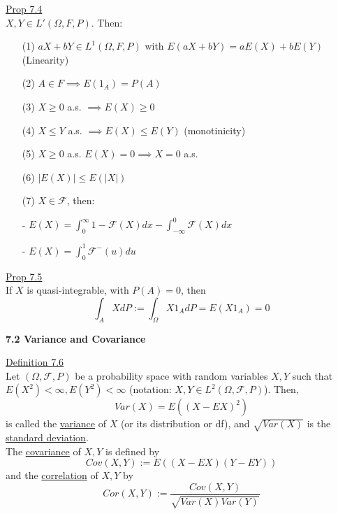 \documentclass[10pt,letterpaper]{article}
\begin{document}
\pagebreak

\underline{Prop 7.4}\\

$X,Y\in L'(\Omega, F, P)$. Then:

\begin{enumerate}

\item[(1)] $aX+bY\in L^1(\Omega, F, P)$ with $E(aX+bY)=aE(X)+bE(Y)$ (Linearity)

\item[(2)] $A\in F\implies E(1_A)=P(A)$

\item[(3)] $X\geq 0$ a.s. $\implies E(X)\geq 0$

\item[(4)] $X\leq Y$ a.s. $\implies E(X)\leq E(Y)$ (monotinicity)

\item[(5)] $X\geq 0$ a.s. $E(X)=0\implies X=0$ a.s.

\item[(6)] $|E(X)|\leq E(|X|)$

\item[(7)] $X\in\mathcal{F}$, then:
  \item[-] $E(X)=\int_0^{\infty}1-\mathcal{F}(X)dx-\int_{-\infty}^0\mathcal{F}(X)dx$
  \item[-] $E(X)=\int_0^1\mathcal{F}^-(u)du$

\end{enumerate}

\underline{Prop 7.5}\\

If $X$ is quasi-integrable, with $P(A)=0$, then $$\int_AXdP:=\int_{\Omega}X1_AdP=E(X1_A)=0$$

\textbf{7.2 Variance and Covariance}

\underline{Definition 7.6}\\

Let $(\Omega, \mathcal{F}, P)$ be a probability space with random variables $X, Y$ such that $E(X^2)<\infty, E(Y^2)<\infty$ (notation: $X, Y\in L^2(\Omega, \mathcal{F}, P)$). Then, $$Var(X)=E((X-EX)^2)$$ is called the \underline{variance} of $X$ (or its distribution or df), and $\sqrt{Var(X)}$ is the \underline{standard deviation}.\\

The \underline{covariance} of $X, Y$ is defined by $$Cov(X, Y):=E((X-EX)(Y-EY))$$ and the \underline{correlation} of $X, Y$ by $$Cor(X, Y):=\frac{Cov(X, Y)}{\sqrt{Var(X)Var(Y)}}$$
\end{document}
